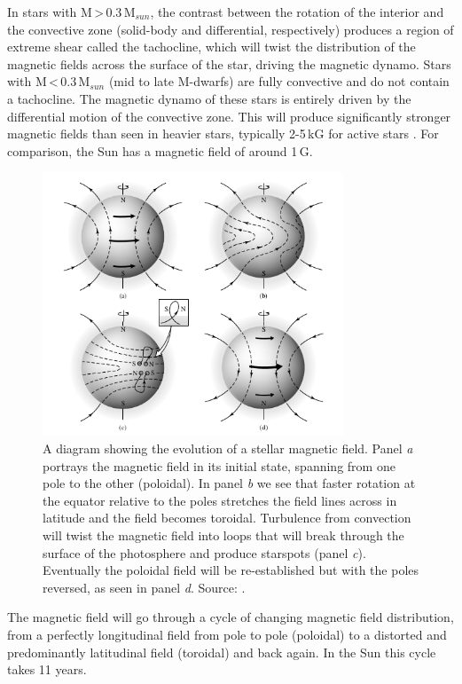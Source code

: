 In stars with M\,\textgreater\,0.3\,M$_{sun}$, the contrast between the rotation of the interior and the convective zone (solid-body and differential, respectively) produces a region of extreme shear called the tachocline, which will twist the distribution of the magnetic fields across the surface of the star, driving the magnetic dynamo. Stars with M\,\textless\,0.3\,M$_{sun}$ (mid to late M-dwarfs) are fully convective and do not contain a tachocline. The magnetic dynamo of these stars is entirely driven by the differential motion of the convective zone. This will produce significantly stronger magnetic fields than seen in heavier stars, typically 2-5\,kG for active stars \citep{2021Kochukhov}. For comparison, the Sun has a magnetic field of around 1\,G. 

\begin{figure}
    \centering
    \includegraphics[width=0.8\textwidth]{Dynamo.png}
    \caption{A diagram showing the evolution of a stellar magnetic field. Panel \textit{a} portrays the magnetic field in its initial state, spanning from one pole to the other (poloidal). In panel \textit{b} we see that faster rotation at the equator relative to the poles stretches the field lines across in latitude and the field becomes toroidal. Turbulence from convection will twist the magnetic field into loops that will break through the surface of the photosphere and produce starspots (panel \textit{c}). Eventually the poloidal field will be re-established but with the poles reversed, as seen in panel \textit{d}. Source: \citet{2006Carroll}.}
    \label{figDynamo}
\end{figure}

The magnetic field will go through a cycle of changing magnetic field distribution, from a perfectly longitudinal field from pole to pole (poloidal) to a distorted and predominantly latitudinal field (toroidal) and back again. In the Sun this cycle takes 11 years.\\

